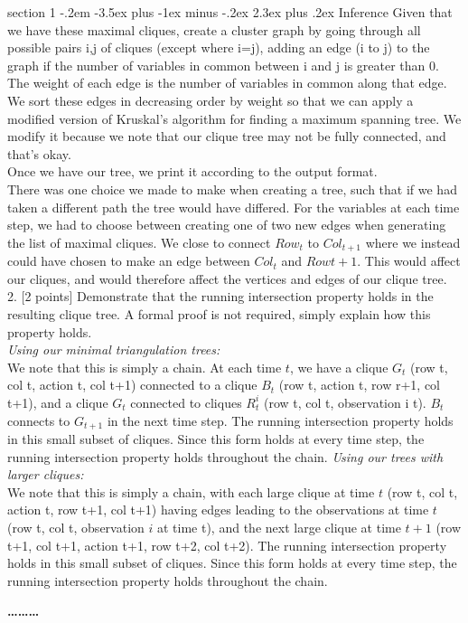 \documentclass[12pt]{article}
\makeatletter
\newenvironment{problem}{\@startsection
       {section}
       {1}
       {-.2em}
       {-3.5ex plus -1ex minus -.2ex}
       {2.3ex plus .2ex}
       {\pagebreak[3]%
       \large\bf\noindent{Problem }
       }
       }
       {%
       \begin{center}\large\bf \ldots\ldots\ldots\end{center}}
\makeatother
\begin{document}
\begin{problem}{Inference}
Given that we have these maximal cliques, create a cluster graph by 
going through all possible pairs i,j of cliques (except where i=j), 
adding an edge (i to j) to the graph if the number of variables in 
common between i and j is greater than 0.  The weight of each edge is
the number of variables in common along that edge.\\

We sort these edges in decreasing order by weight so that we can apply
a modified version of Kruskal's algorithm for finding a maximum spanning
tree.  We modify it because we note that our clique tree may not be 
fully connected, and that's okay.\\

Once we have our tree, we print it according to the output format.\\

There was one choice we made to make when creating a tree, such that if
we had taken a different path the tree would have differed.  For the 
variables at each time step, we had to choose between creating one of 
two new edges when generating the list of maximal cliques.  We close to
connect $Row_t$ to $Col_{t+1}$ where we instead could have chosen to make 
an edge between $Col_t$ and $Row{t+1}$.  This would affect our cliques, and
would therefore affect the vertices and edges of our clique tree.\\

2. [2 points] Demonstrate that the running intersection property holds 
in the resulting clique tree. A formal proof is not required, simply 
explain how this property holds.\\

\textit{Using our minimal triangulation trees:}\\
We note that this is simply a chain.  At each time $t$, we have a clique $G_t$ (row t, col t, action t, col t+1) connected to a clique $B_t$ (row t, action t, row r+1, col t+1), and a clique $G_t$ connected to cliques $R_{t}^{i}$ (row t, col t, observation i t).  $B_t$ connects to $G_{t+1}$ in the next time step.  The running intersection property holds in this small subset of cliques.  Since this form holds at every time step, the running intersection property holds throughout the chain.
\textit{Using our trees with larger cliques:}\\
We note that this is simply a chain, with each large clique at time $t$ (row t, col t, action t, row t+1, col t+1) having edges leading to the observations at time $t$ (row t, col t, observation $i$ at time t), and the next large clique at time $t+1$ (row t+1, col t+1, action t+1, row t+2, col t+2).  The running intersection property holds in this small subset of cliques.  Since this form holds at every time step, the running intersection property holds throughout the chain.\\


\end{problem}
\end{document}
